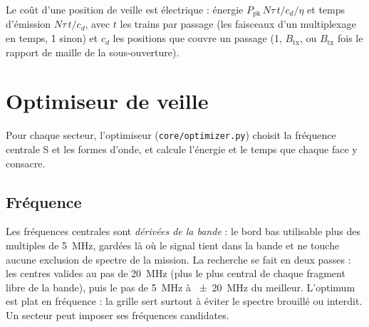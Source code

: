 \documentclass[11pt,a4paper]{article}
\newcommand{\code}[1]{\texttt{\small #1}}
\begin{document}
Le coût d'une position de veille est électrique : énergie $P_{\mathrm{pk}}\,N\tau\,t/c_d/\eta$ et temps d'émission
$N\tau\,t/c_d$, avec $t$ les trains par passage (les faisceaux d'un multiplexage en temps, 1 sinon) et $c_d$ les
positions que couvre un passage (1, $B_{\mathrm{tx}}$, ou $B_{\mathrm{tx}}$ fois le rapport de maille de la
sous-ouverture).

\section{Optimiseur de veille}\label{sec:opt}
Pour chaque secteur, l'optimiseur (\code{core/optimizer.py}) choisit la fréquence centrale S et les formes d'onde, et
calcule l'énergie et le temps que chaque face y consacre.

\subsection{Fréquence}
Les fréquences centrales sont \emph{dérivées de la bande} : le bord bas utilisable plus des multiples de
\SI{5}{MHz}, gardées là où le signal tient dans la bande et ne touche aucune exclusion de spectre de la mission. La
recherche se fait en deux passes : les centres valides au pas de \SI{20}{MHz} (plus le plus central de chaque fragment
libre de la bande), puis le pas de \SI{5}{MHz} à \SI{\pm20}{MHz} du meilleur. L'optimum est plat en fréquence : la
grille sert surtout à éviter le spectre brouillé ou interdit. Un secteur peut imposer ses fréquences candidates.
\end{document}
